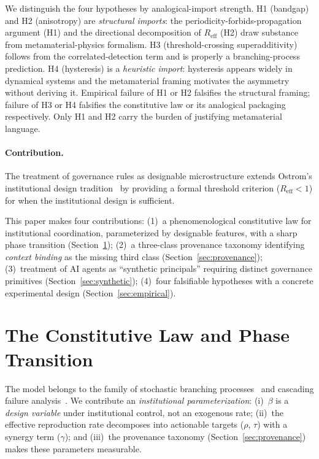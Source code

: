 \documentclass[runningheads]{llncs}
\begin{document}
We distinguish the four hypotheses by analogical-import strength. H1 (bandgap) and H2 (anisotropy) are \emph{structural imports}: the periodicity-forbids-propagation argument (H1) and the directional decomposition of $R_{\mathrm{eff}}$ (H2) draw substance from metamaterial-physics formalism. H3 (threshold-crossing superadditivity) follows from the correlated-detection term and is properly a branching-process prediction. H4 (hysteresis) is a \emph{heuristic import}: hysteresis appears widely in dynamical systems and the metamaterial framing motivates the asymmetry without deriving it. Empirical failure of H1 or H2 falsifies the structural framing; failure of H3 or H4 falsifies the constitutive law or its analogical packaging respectively. Only H1 and H2 carry the burden of justifying metamaterial language.

\paragraph{Contribution.}
The treatment of governance rules as designable microstructure extends Ostrom's institutional design tradition~\cite{ostrom1990governing} by providing a formal threshold criterion ($R_{\mathrm{eff}} < 1$) for when the institutional design is sufficient.

This paper makes four contributions: (1)~a phenomenological constitutive law for institutional coordination, parameterized by designable features, with a sharp phase transition (Section~\ref{sec:constitutive}); (2)~a three-class provenance taxonomy identifying \emph{context binding} as the missing third class (Section~\ref{sec:provenance}); (3)~treatment of AI agents as ``synthetic principals'' requiring distinct governance primitives (Section~\ref{sec:synthetic}); (4)~four falsifiable hypotheses with a concrete experimental design (Section~\ref{sec:empirical}).


\section{The Constitutive Law and Phase Transition}
\label{sec:constitutive}

The model belongs to the family of stochastic branching processes~\cite{anderson1991infectious,hethcote2000mathematics} and cascading failure analysis~\cite{watts2002simple,buldyrev2010catastrophic,dobson2024cascading}. We contribute an \emph{institutional parameterization}: (i)~$\beta$ is a \emph{design variable} under institutional control, not an exogenous rate; (ii)~the effective reproduction rate decomposes into actionable targets ($\rho$, $\tau$) with a synergy term ($\gamma$); and (iii)~the provenance taxonomy (Section~\ref{sec:provenance}) makes these parameters measurable.
\end{document}
